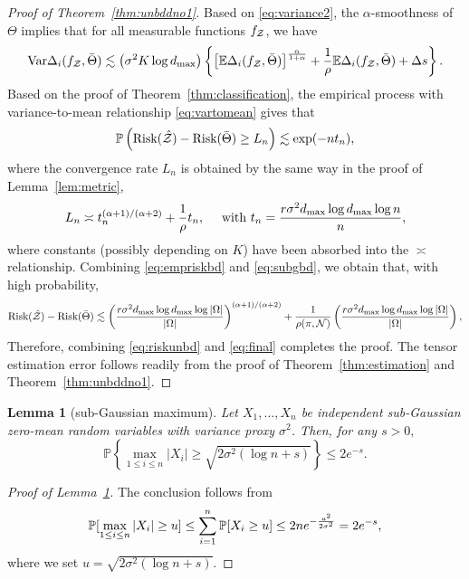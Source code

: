 \documentclass[11pt]{article}
\theoremstyle{plain}
\newtheorem{lem}{Lemma}[section]
\theoremstyle{definition}
\begin{document}
\begin{proof}[Proof of Theorem~\ref{thm:unbddno1}]
Based on \eqref{eq:variance2}, the $\alpha$-smoothness of $\Theta$ implies that for all measurable functions $f_{\mathcal{Z}}$, we have
\begin{align}\label{eq:vartomean}
\text{Var}\Delta_i(f_{\mathcal{Z}},\bar \Theta)\lesssim \left(\sigma^2K\log d_{\max}\right) \left\{\left[\mathbb{E}\Delta_i(f_{\mathcal{Z}},\bar \Theta)\right]^{\alpha\over1+\alpha}+\frac{1}{\rho}\mathbb{E}\Delta_i(f_{\mathcal{Z}},\bar \Theta)+\Delta s\right\}.
\end{align}
Based on the proof of Theorem~\ref{thm:classification}, the empirical process with variance-to-mean relationship  \eqref{eq:vartomean} gives that
\begin{align}\label{eq:empriskbd}
\mathbb{P	}\left(\text{Risk}(\hat{\mathcal{Z}})-\text{Risk}(\bar\Theta)\geq L_n\right)\lesssim \exp(-nt_n),
\end{align}
where the convergence rate $L_n$ is obtained by the same way in the proof of Lemma~\ref{lem:metric}, 
\begin{align}\label{eq:subgbd}
L_n\asymp t_n^{(\alpha+1)/(\alpha+2)}+\frac{1}{\rho}t_n,\quad\text{ with } t_n =  {r \sigma^2 d_{\max}\log d_{\max}\log n  \over n},
\end{align}
where constants (possibly depending on $K$) have been absorbed into the $\asymp$ relationship.
Combining \eqref{eq:empriskbd} and \eqref{eq:subgbd}, we obtain that, with high probability, 
\begin{align}\label{eq:riskunbd}
   \text{Risk}(\hat{\mathcal{Z}})-\text{Risk}(\bar\Theta)\lesssim \left( {r \sigma^2  d_{\max}\log d_{\max}\log|\Omega|  \over |\Omega|}\right)^{(\alpha+1)/(\alpha+2)}+\frac{1}{\rho(\pi,\mathcal{N})} \left({r \sigma^2  d_{\max} \log d_{\max}\log|\Omega| \over |\Omega|} \right),
\end{align} 
 Therefore, combining \eqref{eq:riskunbd} and \eqref{eq:final} completes the proof. The tensor estimation error follows readily from the proof of Theorem~\ref{thm:estimation} and Theorem~\ref{thm:unbddno1}.
\end{proof}


\begin{lem}[sub-Gaussian maximum]\label{lem:subg}
Let $X_1,\ldots,X_n$ be independent sub-Gaussian zero-mean random variables with variance proxy $\sigma^2$. Then, for any $s>0,$
\[\mathbb{P}\left\{\max_{1\leq i\leq n}|X_i|\geq\sqrt{2\sigma^2(\log n +s)}\right\}\leq2 e^{-s}.\]
\end{lem}
\begin{proof}[Proof of Lemma~\ref{lem:subg}]
The conclusion follows from
\begin{align}
\mathbb{P}[\max_{1\leq i\leq n}|X_i|\geq u] \leq \sum_{i=1}^n\mathbb{P}[X_i\geq u]\leq 2n e^{-{u^2\over 2\sigma^2}} = 2e^{-s},
\end{align}
where we set $u = \sqrt{2\sigma^2(\log n+s)}.$
\end{proof}
\end{document}
